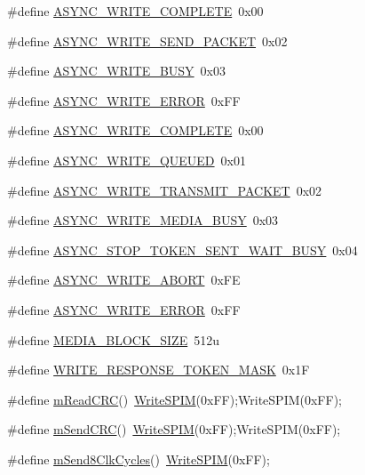 \begin{DoxyCompactItemize}
\item 
\#define \hyperlink{_s_d-_s_p_i_8h_a70d0ab2c7d97659eb0babe8a2e1fbc8f}{A\+S\+Y\+N\+C\+\_\+\+W\+R\+I\+T\+E\+\_\+\+C\+O\+M\+P\+L\+E\+T\+E}~0x00
\item 
\#define \hyperlink{_s_d-_s_p_i_8h_aba149dcbc302d8a51d753e6cb1bab381}{A\+S\+Y\+N\+C\+\_\+\+W\+R\+I\+T\+E\+\_\+\+S\+E\+N\+D\+\_\+\+P\+A\+C\+K\+E\+T}~0x02
\item 
\#define \hyperlink{_s_d-_s_p_i_8h_acf7b993c3ef3ee06c47dd1fd3ff87a99}{A\+S\+Y\+N\+C\+\_\+\+W\+R\+I\+T\+E\+\_\+\+B\+U\+S\+Y}~0x03
\item 
\#define \hyperlink{_s_d-_s_p_i_8h_ad1793c094ef91e7f16bf6030e949d421}{A\+S\+Y\+N\+C\+\_\+\+W\+R\+I\+T\+E\+\_\+\+E\+R\+R\+O\+R}~0x\+F\+F
\item 
\#define \hyperlink{_s_d-_s_p_i_8h_a70d0ab2c7d97659eb0babe8a2e1fbc8f}{A\+S\+Y\+N\+C\+\_\+\+W\+R\+I\+T\+E\+\_\+\+C\+O\+M\+P\+L\+E\+T\+E}~0x00
\item 
\#define \hyperlink{_s_d-_s_p_i_8h_af9be46e1eaf54ba5f0a755b4318b6d9c}{A\+S\+Y\+N\+C\+\_\+\+W\+R\+I\+T\+E\+\_\+\+Q\+U\+E\+U\+E\+D}~0x01
\item 
\#define \hyperlink{_s_d-_s_p_i_8h_ae49987b89327b4306f5943f9e990e43b}{A\+S\+Y\+N\+C\+\_\+\+W\+R\+I\+T\+E\+\_\+\+T\+R\+A\+N\+S\+M\+I\+T\+\_\+\+P\+A\+C\+K\+E\+T}~0x02
\item 
\#define \hyperlink{_s_d-_s_p_i_8h_a0b8d0f70d6ee62c265f9dede51609c72}{A\+S\+Y\+N\+C\+\_\+\+W\+R\+I\+T\+E\+\_\+\+M\+E\+D\+I\+A\+\_\+\+B\+U\+S\+Y}~0x03
\item 
\#define \hyperlink{_s_d-_s_p_i_8h_a1dad5b985a2bb06e698b3e57a81c20c9}{A\+S\+Y\+N\+C\+\_\+\+S\+T\+O\+P\+\_\+\+T\+O\+K\+E\+N\+\_\+\+S\+E\+N\+T\+\_\+\+W\+A\+I\+T\+\_\+\+B\+U\+S\+Y}~0x04
\item 
\#define \hyperlink{_s_d-_s_p_i_8h_a54e49f3fc18178e04ff99f9aa91ba074}{A\+S\+Y\+N\+C\+\_\+\+W\+R\+I\+T\+E\+\_\+\+A\+B\+O\+R\+T}~0x\+F\+E
\item 
\#define \hyperlink{_s_d-_s_p_i_8h_ad1793c094ef91e7f16bf6030e949d421}{A\+S\+Y\+N\+C\+\_\+\+W\+R\+I\+T\+E\+\_\+\+E\+R\+R\+O\+R}~0x\+F\+F
\item 
\#define \hyperlink{_s_d-_s_p_i_8h_acd29208d57d1a6b5318c6cef8a9f2ace}{M\+E\+D\+I\+A\+\_\+\+B\+L\+O\+C\+K\+\_\+\+S\+I\+Z\+E}~512u
\item 
\#define \hyperlink{_s_d-_s_p_i_8h_a2eabb26946135fdfb97ad7321d6a21c3}{W\+R\+I\+T\+E\+\_\+\+R\+E\+S\+P\+O\+N\+S\+E\+\_\+\+T\+O\+K\+E\+N\+\_\+\+M\+A\+S\+K}~0x1\+F
\item 
\#define \hyperlink{_s_d-_s_p_i_8h_ab72293582f3e700d54c23cb0459f7ae4}{m\+Read\+C\+R\+C}()~\hyperlink{_s_d-_s_p_i_8c_ab4e7f228a81fb435b37e82b99fb27bb5}{Write\+S\+P\+I\+M}(0x\+F\+F);\+Write\+S\+P\+I\+M(0x\+F\+F);
\item 
\#define \hyperlink{_s_d-_s_p_i_8h_a1992deb2d329fd5e7451fbe02490567e}{m\+Send\+C\+R\+C}()~\hyperlink{_s_d-_s_p_i_8c_ab4e7f228a81fb435b37e82b99fb27bb5}{Write\+S\+P\+I\+M}(0x\+F\+F);\+Write\+S\+P\+I\+M(0x\+F\+F);
\item 
\#define \hyperlink{_s_d-_s_p_i_8h_a036002c221bb5d9b5be8e300229e82c9}{m\+Send8\+Clk\+Cycles}()~\hyperlink{_s_d-_s_p_i_8c_ab4e7f228a81fb435b37e82b99fb27bb5}{Write\+S\+P\+I\+M}(0x\+F\+F);
\end{DoxyCompactItemize}
